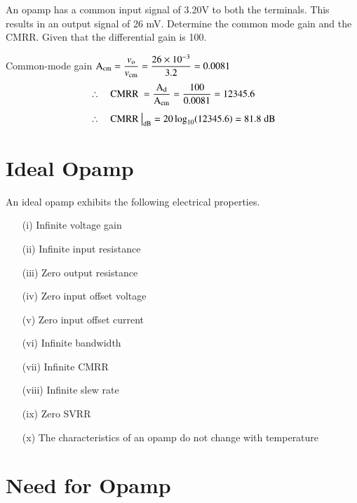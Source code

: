 \begin{problem}\label{prob4.11}
An opamp has a common input signal of 3.20V to both the terminals. This results in an output signal of 26 mV. Determine the common mode gain and the CMRR. Given that the differential gain is 100.
\end{problem}

\begin{solution}
Common-mode gain $\textrm{A}_{\text{cm}}=\dfrac{v_{\textrm{o}}}{v_{\text{cm}}}=\dfrac{26\times 10^{-3}}{3.2}=0.0081$
\begin{align*}
&\therefore\quad \text{CMRR~} = \frac{\textrm{A}_{\text{d}}}{\textrm{A}_{\text{cm}}}=\frac{100}{0.0081}=12345.6\\[4pt]
&\therefore\quad \text{CMRR~}\big|_{\text{dB}}=20\log_{10}(12345.6)=81.8\;\text{dB}
\end{align*}
\end{solution}

\section{Ideal Opamp}\label{sec4.4}

An ideal opamp exhibits the following electrical properties.
\begin{itemize}
\item[(i)] Infinite voltage gain

\item[(ii)] Infinite input resistance

\item[(iii)] Zero output resistance

\item[(iv)] Zero input offset voltage

\item[(v)] Zero input offset current

\item[(vi)] Infinite bandwidth

\item[(vii)] Infinite CMRR

\item[(viii)] Infinite slew rate

\item[(ix)] Zero SVRR

\item[(x)] The characteristics of an opamp do not change with temperature
\end{itemize}

\section{Need for Opamp}\label{sec4.5}

